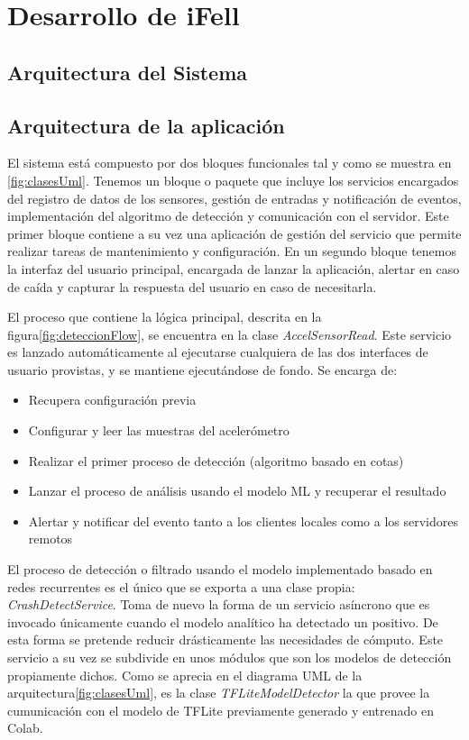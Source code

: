 \section{Desarrollo de iFell}

\subsection{Arquitectura del Sistema}

\subsection{Arquitectura de la aplicación}

El sistema está compuesto por dos bloques funcionales tal y como se muestra en \ref{fig:clasesUml}. Tenemos un bloque o paquete que incluye los servicios encargados del registro de datos de los sensores, gestión de entradas y notificación de eventos, implementación del algoritmo de detección y comunicación con el servidor. Este primer bloque contiene a su vez una aplicación de gestión del servicio que permite realizar tareas de mantenimiento y configuración. En un segundo bloque tenemos la interfaz del usuario principal, encargada de lanzar la aplicación, alertar en caso de caída y capturar la respuesta del usuario en caso de necesitarla.


El proceso que contiene la lógica principal, descrita en la figura\ref{fig:deteccionFlow}, se encuentra en la clase \textit{AccelSensorRead}. Este servicio es lanzado automáticamente al ejecutarse cualquiera de las dos interfaces de usuario provistas, y se mantiene ejecutándose de fondo. Se encarga de:

\begin{itemize}
  \item Recupera configuración previa
  \item Configurar y leer las muestras del acelerómetro
  \item Realizar el primer proceso de detección (algoritmo basado en cotas)
  \item Lanzar el proceso de análisis usando el modelo ML y recuperar el resultado
  \item Alertar y notificar del evento tanto a los clientes locales como a los servidores remotos
\end{itemize}

El proceso de detección o filtrado usando el modelo implementado basado en redes recurrentes es el único que se exporta a una clase propia: \textit{CrashDetectService}. Toma de nuevo la forma de un servicio asíncrono que es invocado únicamente cuando el modelo analítico ha detectado un positivo. De esta forma se pretende reducir drásticamente las necesidades de cómputo. Este servicio a su vez se subdivide en unos módulos que son los modelos de detección propiamente dichos. Como se aprecia en el diagrama UML de la arquitectura\ref{fig:clasesUml}, es la clase \textit{TFLiteModelDetector} la que provee la cumunicación con el modelo de TFLite previamente generado y entrenado en Colab.


